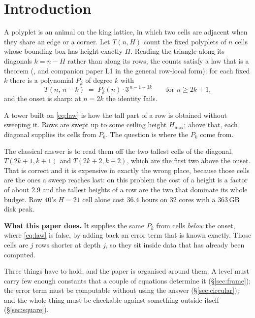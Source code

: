 \documentclass[11pt]{article}
\begin{document}
\tableofcontents

\section{Introduction}\label{sec:intro}

A polyplet is an animal on the king lattice, in which two cells are adjacent
when they share an edge or a corner. Let $T(n,H)$ count the fixed polyplets of
$n$ cells whose bounding box has height exactly $H$. Reading the triangle along its diagonals
$k = n - H$ rather than along its rows, the counts satisfy a law that is a
theorem (, and companion paper L1 in the
general row-local form): for each fixed $k$ there is a polynomial $P_k$ of
degree $k$ with
\begin{equation}\label{eq:law}
  T(n,\,n-k) \;=\; P_k(n)\cdot 3^{\,n-1-3k}
  \qquad\text{for } n \ge 2k+1,
\end{equation}
and the onset is sharp: at $n = 2k$ the identity fails.

A tower built on \eqref{eq:law} is how the tall part of a row is obtained
without sweeping it. Rows are swept up to some ceiling height $H_{\max}$;
above that, each diagonal supplies its cells from $P_k$. The question is where
the $P_k$ come from.

The classical answer is to read them off the two tallest cells of the diagonal,
$T(2k+1,k+1)$ and $T(2k+2,k+2)$, which are the first two above the onset. That
is correct and it is expensive in exactly the wrong place, because those cells
are the ones a sweep reaches last: on this problem the cost of a height is a
factor of about $2.9$ and the tallest heights of a row are the two that dominate
its whole budget. Row $40$'s $H = 21$ cell alone cost $36.4$ hours on 32 cores
with a $363$\,GB disk peak.

\medskip
\noindent
\textbf{What this paper does.} It supplies the same $P_k$ from cells
\emph{below} the onset, where \eqref{eq:law} is false, by adding back an error
term that is known exactly. Those cells are $j$ rows shorter at depth $j$, so
they sit inside data that has already been computed.

Three things have to hold, and the paper is organised around them. A level must
carry few enough constants that a couple of equations determine it
(\S\ref{sec:frame}); the error term must be computable without using the answer
(\S\ref{sec:circular}); and the whole thing must be checkable against something
outside itself (\S\ref{sec:square}).
\end{document}
